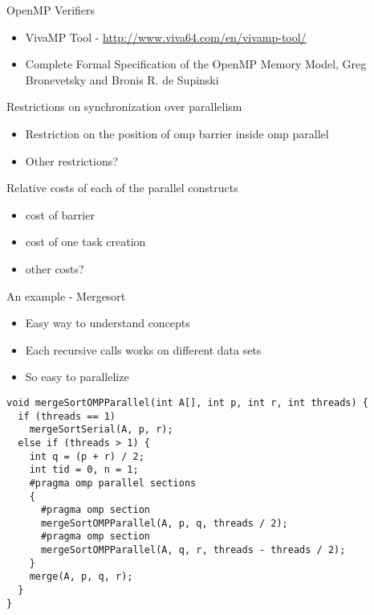 \documentclass[10pt]{beamer}
\begin{document}
\begin{frame}{OpenMP Verifiers}
\begin{itemize}
\item VivaMP Tool -  \url{http://www.viva64.com/en/vivamp-tool/}
\item Complete Formal Specification of the OpenMP Memory Model,
  Greg Bronevetsky and Bronis R. de Supinski
\end{itemize}
\end{frame}

\begin{frame}{Restrictions on synchronization over parallelism}
\begin{itemize}
\item Restriction on the position of omp barrier inside omp parallel
\item Other restrictions?
\end{itemize}
\end{frame}

\begin{frame}{Relative costs of each of the parallel constructs}
\begin{itemize}
\item cost of barrier
\item cost of one task creation
\item other costs?
\end{itemize}
\end{frame}

\begin{frame}[fragile]{An example - Mergesort}
\begin{itemize}
\item Easy way to understand concepts
\item Each recursive calls works on different data sets
\item So easy to parallelize
\end{itemize}
\begin{Verbatim}[frame=single, fontsize=\small, formatcom=\color{red}]
void mergeSortOMPParallel(int A[], int p, int r, int threads) {
  if (threads == 1)
    mergeSortSerial(A, p, r);
  else if (threads > 1) {
    int q = (p + r) / 2;
    int tid = 0, n = 1;
    #pragma omp parallel sections
    {
      #pragma omp section
      mergeSortOMPParallel(A, p, q, threads / 2);
      #pragma omp section
      mergeSortOMPParallel(A, q, r, threads - threads / 2);
    }
    merge(A, p, q, r);
  }
}
\end{Verbatim}
\end{frame}
\end{document}
